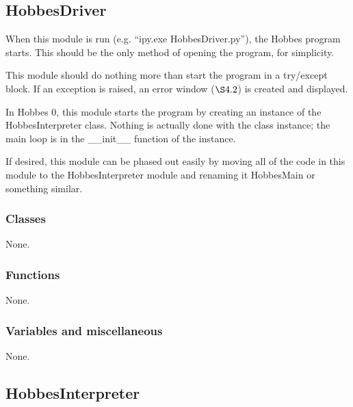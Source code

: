 \documentclass[12pt,letterpaper]{article}
\begin{document}
\setcounter{subsection}{-1}



%
%
\subsection{HobbesDriver}
\label{4.0}

When this module is run (e.g. ``ipy.exe HobbesDriver.py''), the Hobbes program starts. This should be the only method of opening the program, for simplicity.

This module should do nothing more than start the program in a try/except block. If an exception is raised, an error window (\hyperref[4.2]{$\S4.2$}) is created and displayed.

In Hobbes 0, this module starts the program by creating an instance of the HobbesInterpreter class. Nothing is actually done with the class instance; the main loop is in the \_\_init\_\_ function of the instance.

If desired, this module can be phased out easily by moving all of the code in this module to the HobbesInterpreter module and renaming it HobbesMain or something similar.

\setcounter{subsubsection}{-1}



%
%
\subsubsection{Classes}
\label{4.0.0}

None.



%
%
\subsubsection{Functions}
\label{4.0.1}

None.



%
%
\subsubsection{Variables and miscellaneous}
\label{4.0.2}

None.



%
%
\subsection{HobbesInterpreter}
\label{4.1}
\end{document}

